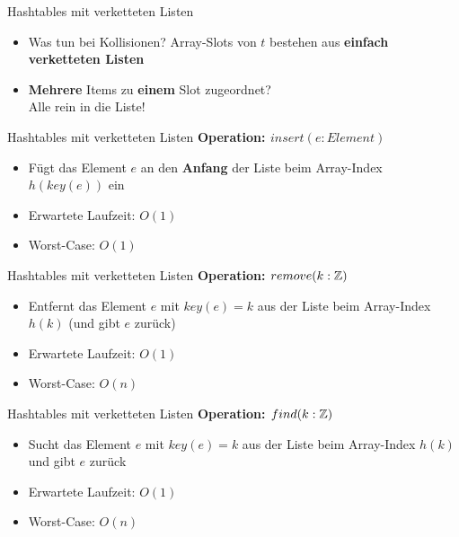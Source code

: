 \begin{frame}{Hashtables mit verketteten Listen}
	\begin{itemize}
		\item Was tun bei Kollisionen?
		\pause
		\implitem Array-Slots von $t$ bestehen aus \textbf{einfach verketteten Listen} \pause
		\item \textbf{Mehrere} Items zu \textbf{einem} Slot zugeordnet? \\
		Alle rein in die Liste!
	\end{itemize}
\end{frame}


\begin{frame}{Hashtables mit verketteten Listen}
	\textbf{Operation: $insert(e : Element)$} \\[0,125cm]
	\begin{itemize}
		\item Fügt das Element $e$ an den \textbf{Anfang} der Liste beim Array-Index $h(key(e))$ ein
		\pause
		\item Erwartete Laufzeit: $O(1)$
		\item Worst-Case: $O(1)$
	\end{itemize}
\end{frame}

\begin{frame}{Hashtables mit verketteten Listen}
	\textbf{Operation: $remove(k : \mathbb{Z})$} \\[0,125cm]
	\begin{itemize}
		\item Entfernt das Element $e$ mit $key(e) = k$ aus der Liste beim Array-Index $h(k)$ (und gibt $e$ zurück)
		\pause
		\item Erwartete Laufzeit: $O(1)$
		\item Worst-Case: $O(n)$
	\end{itemize}
\end{frame}

\begin{frame}{Hashtables mit verketteten Listen}
	\textbf{Operation: $find(k : \mathbb{Z})$} \\[0,125cm]
	\begin{itemize}
		\item Sucht das Element $e$ mit $key(e) = k$ aus der Liste beim Array-Index $h(k)$ und gibt $e$ zurück
		\pause
		\item Erwartete Laufzeit: $O(1)$
		\item Worst-Case: $O(n)$
	\end{itemize}
\end{frame}


